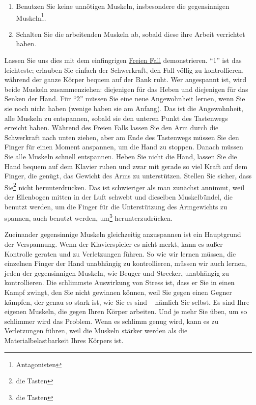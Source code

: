 \begin{enumerate}[label={\arabic*.}] 
\item Benutzen Sie keine unnötigen Muskeln, insbesondere die gegensinnigen Muskeln\footnote{Antagonisten}.
\item Schalten Sie die arbeitenden Muskeln ab, sobald diese ihre Arbeit verrichtet haben.
 \end{enumerate}
Lassen Sie uns dies mit dem einfingrigen \hyperref[c1ii10]{Freien Fall} demonstrieren.
\enquote{1} ist das leichteste; erlauben Sie einfach der Schwerkraft, den Fall völlig zu kontrollieren, während der ganze Körper bequem auf der Bank ruht.
Wer angespannt ist, wird beide Muskeln zusammenziehen: diejenigen für das Heben und diejenigen für das Senken der Hand.
Für \enquote{2} müssen Sie eine neue Angewohnheit lernen, wenn Sie sie noch nicht haben (wenige haben sie am Anfang).
Das ist die Angewohnheit, alle Muskeln zu entspannen, sobald sie den unteren Punkt des Tastenwegs erreicht haben.
Während des Freien Falls lassen Sie den Arm durch die Schwerkraft nach unten ziehen, aber am Ende des Tastenwegs müssen Sie den Finger für einen Moment anspannen, um die Hand zu stoppen.
Danach müssen Sie alle Muskeln schnell entspannen.
Heben Sie nicht die Hand, lassen Sie die Hand bequem auf dem Klavier ruhen und zwar mit gerade so viel Kraft auf dem Finger, die genügt, das Gewicht des Arms zu unterstützen.
Stellen Sie sicher, dass Sie\footnote{die Tasten} nicht herunterdrücken.
Das ist schwieriger als man zunächst annimmt, weil der Ellenbogen mitten in der Luft schwebt und dieselben Muskelbündel, die benutzt werden, um die Finger für die Unterstützung des Armgewichts zu spannen, auch benutzt werden, um\footnote{die Tasten} herunterzudrücken.

Zueinander gegensinnige Muskeln gleichzeitig anzuspannen ist ein Hauptgrund der Verspannung.
Wenn der Klavierspieler es nicht merkt, kann es außer Kontrolle geraten und zu Verletzungen führen.
So wie wir lernen müssen, die einzelnen Finger der Hand unabhängig zu kontrollieren, müssen wir auch lernen, jeden der gegensinnigen Muskeln, wie Beuger und Strecker, unabhängig zu kontrollieren.
Die schlimmste Auswirkung von Stress ist, dass er Sie in einen Kampf zwingt, den Sie nicht gewinnen können, weil Sie gegen einen Gegner kämpfen, der genau so stark ist, wie Sie es sind -- nämlich Sie selbst.
Es sind Ihre eigenen Muskeln, die gegen Ihren Körper arbeiten. 
Und je mehr Sie üben, um so schlimmer wird das Problem.
Wenn es schlimm genug wird, kann es zu Verletzungen führen, weil die Muskeln stärker werden als die Materialbelastbarkeit Ihres Körpers ist.

